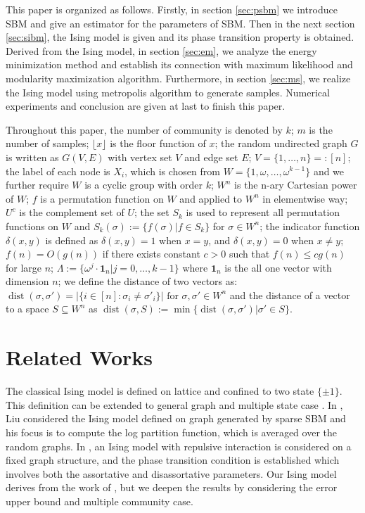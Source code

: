 \documentclass[entropy,article,submit,moreauthors,pdftex]{Definitions/mdpi}
\newcommand{\1}{\mathbbm{1}}
\DeclareMathOperator{\Dist}{dist}
\begin{document}
This paper is organized as follows. Firstly, in section \ref{sec:psbm} we introduce SBM and give an estimator for the parameters of SBM.
Then in the next section \ref{sec:sibm}, the Ising model is given and its phase transition property is obtained.
Derived from the Ising model, in section \ref{sec:em}, we analyze the energy minimization method and establish its connection with maximum likelihood and modularity
maximization algorithm. Furthermore, in section \ref{sec:ms},
we realize the Ising model using metropolis algorithm to generate samples. Numerical experiments and conclusion are given at last to finish this paper.

Throughout this paper, the number of community is denoted by $k$; $m$ is the number of samples; $\lfloor x \rfloor$ is the floor function of $x$; the random undirected graph $G$ is written as $G(V,E)$ with vertex set $V$ and edge set $E$;
$V=\{1,\dots, n\} =: [n]$;
the label of each node is $X_i$, which is chosen from $W= \{1, \omega, \dots, \omega^{k-1}\}$ and we further require $W$
is a cyclic group with order $k$; $W^n$ is the n-ary Cartesian power of $W$;
$f$ is a permutation function on $W$ and applied to $W^n$ in elementwise way;
$U^c$ is the complement set of $U$;  
the set $S_k$ is used to represent all permutation functions on $W$ and $S_k(\sigma):=\{f(\sigma)| f\in S_k\}$ for $\sigma \in W^n$;
the indicator function $\delta(x,y)$ is defined as
$\delta(x,y) = 1 $ when $x=y$, and $\delta(x,y)=0$ when $x\neq y$;
$f(n) = O(g(n))$ if there exists constant $c > 0$ such that $ f(n) \leq c g(n)$
for large $n$;
$\Lambda := \{ \omega^j  \cdot \mathbf{1}_n | j=0, \dots,k-1\}$
where $\mathbf{1}_n$ is the all one vector with dimension $n$;
we define the distance of two vectors as:
$\Dist(\sigma, \sigma')
=|\{i\in[n]:\sigma_i\neq \sigma'_i\}| \textrm{ for } \sigma,\sigma'\in W^n
$ and the distance of a vector to a space $S\subseteq W^n$
as
$\Dist(\sigma,S)
:=\min\{\Dist(\sigma, \sigma') | \sigma' \in S\}
$.
 
\section{Related Works}
The classical Ising model is defined on lattice and confined to two state $\{\pm 1\}$. This definition
can be extended to general graph and multiple state case \cite{potts1952some}. In \cite{liu2017log}, Liu considered
the Ising model defined on graph generated by sparse SBM and his focus is to compute the log partition function,
which is averaged over the random graphs. In \cite{berthet2019exact}, an Ising model with repulsive interaction
is considered on a fixed graph structure, and the phase transition condition is established which involves both the assortative and disassortative
parameters. Our Ising model derives from the work of \cite{ye2020exact}, but we deepen the results by considering the error upper bound and
multiple community case.
\end{document}
